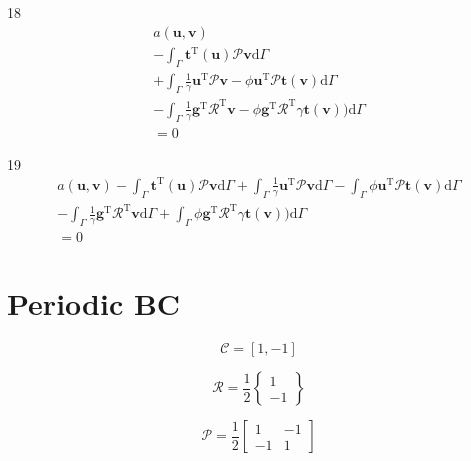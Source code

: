 \documentclass[a4paper,12pt]{article}
\begin{document}
18
\begin{equation}
\begin{split}
a(\mathbf{u},\mathbf{v})
\\-
\int_\Gamma
\mathbf{t}^\textrm{T}(\mathbf{u})\mathcal{P}\mathbf{v}
\textrm{d}\Gamma
\\+
\int_\Gamma
\frac{1}{\gamma}
\mathbf{u}^\textrm{T}\mathcal{P}\mathbf{v}
-
\phi\mathbf{u}^\textrm{T}\mathcal{P}\mathbf{t}(\mathbf{v})
\textrm{d}\Gamma
\\-
\int_\Gamma
\frac{1}{\gamma}
\mathbf{g}^\textrm{T}\mathcal{R}^\textrm{T}
\mathbf{v}
-
\phi\mathbf{g}^\textrm{T}\mathcal{R}^\textrm{T}\gamma\mathbf{t}(\mathbf{v}))
\textrm{d}\Gamma
\\=
0
\end{split}
\end{equation}

19
\begin{equation}
\begin{split}
a(\mathbf{u},\mathbf{v})
-
\int_\Gamma
\mathbf{t}^\textrm{T}(\mathbf{u})\mathcal{P}\mathbf{v}
\textrm{d}\Gamma
+
\int_\Gamma
\frac{1}{\gamma}
\mathbf{u}^\textrm{T}\mathcal{P}\mathbf{v}
\textrm{d}\Gamma
-
\int_\Gamma
\phi\mathbf{u}^\textrm{T}\mathcal{P}\mathbf{t}(\mathbf{v})
\textrm{d}\Gamma
\\-
\int_\Gamma
\frac{1}{\gamma}
\mathbf{g}^\textrm{T}\mathcal{R}^\textrm{T}
\mathbf{v}
\textrm{d}\Gamma
+
\int_\Gamma
\phi\mathbf{g}^\textrm{T}\mathcal{R}^\textrm{T}\gamma\mathbf{t}(\mathbf{v}))
\textrm{d}\Gamma
\\=
0
\end{split}
\end{equation}

\section{Periodic BC}

\begin{equation}
\mathcal{C} = [1,-1]
\end{equation}

\begin{equation}
\mathcal{R} = \frac{1}{2}
\left\{
\begin{array}{c}
1\\
-1
\end{array}
\right\}
\end{equation}

\begin{equation}
\mathcal{P} = \frac{1}{2}
\left[
\begin{array}{cc}
1 & -1\\
-1 & 1
\end{array}
\right]
\end{equation}
\end{document}
